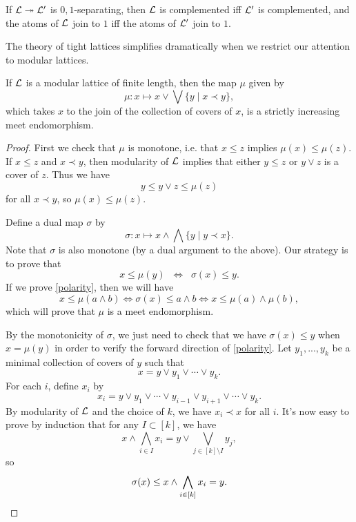 \begin{appendices}
\begin{prop} If $\mathcal{L} \twoheadrightarrow \mathcal{L}'$ is $0,1$-separating, then $\mathcal{L}$ is complemented iff $\mathcal{L}'$ is complemented, and the atoms of $\mathcal{L}$ join to $1$ iff the atoms of $\mathcal{L}'$ join to $1$.
\end{prop}

The theory of tight lattices simplifies dramatically when we restrict our attention to modular lattices.

\begin{prop} If $\mathcal{L}$ is a modular lattice of finite length, then the map $\mu$ given by
\[
\mu : x \mapsto x \vee \bigvee\{y \mid x \prec y\},
\]
which takes $x$ to the join of the collection of covers of $x$, is a strictly increasing meet endomorphism.
\end{prop}
\begin{proof} First we check that $\mu$ is monotone, i.e. that $x \le z$ implies $\mu(x) \le \mu(z)$. If $x \le z$ and $x \prec y$, then modularity of $\mathcal{L}$ implies that either $y \le z$ or $y \vee z$ is a cover of $z$. Thus we have
\[
y \le y \vee z \le \mu(z)
\]
for all $x \prec y$, so $\mu(x) \le \mu(z)$.

Define a dual map $\sigma$ by
\[
\sigma : x \mapsto x \wedge \bigwedge\{y \mid y \prec x\}.
\]
Note that $\sigma$ is also monotone (by a dual argument to the above). Our strategy is to prove that
\begin{equation}
x \le \mu(y) \;\; \iff \;\; \sigma(x) \le y.\tag{$*$}\label{polarity}
\end{equation}
If we prove \eqref{polarity}, then we will have
\[
x \le \mu(a \wedge b) \iff \sigma(x) \le a \wedge b \iff x \le \mu(a) \wedge \mu(b),
\]
which will prove that $\mu$ is a meet endomorphism.

By the monotonicity of $\sigma$, we just need to check that we have $\sigma(x) \le y$ when $x = \mu(y)$ in order to verify the forward direction of \eqref{polarity}. Let $y_1, ..., y_k$ be a minimal collection of covers of $y$ such that
\[
x = y \vee y_1 \vee \cdots \vee y_k.
\]
For each $i$, define $x_i$ by
\[
x_i = y \vee y_1 \vee \cdots \vee y_{i-1} \vee y_{i+1} \vee \cdots \vee y_k.
\]
By modularity of $\mathcal{L}$ and the choice of $k$, we have $x_i \prec x$ for all $i$. It's now easy to prove by induction that for any $I \subset [k]$, we have
\[
x \wedge \bigwedge_{i \in I} x_i = y \vee \bigvee_{j \in [k]\setminus I} y_j,
\]
so
\[
\sigma(x) \le x \wedge \bigwedge_{i \in [k]} x_i = y.\qedhere
\]
\end{proof}


\end{appendices}
